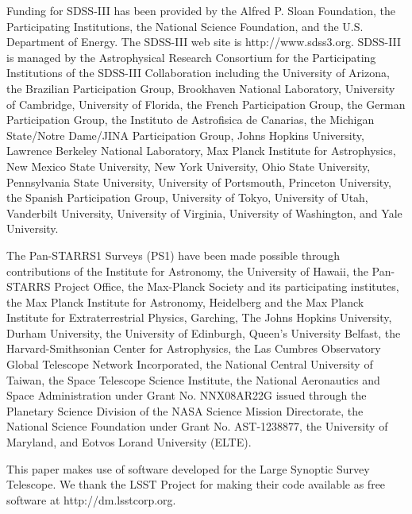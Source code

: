 \documentclass{emulateapj}
\begin{document}
\begin{CJK*}{UTF8}{gbsn}
  Funding for SDSS-III has been provided by the Alfred P. Sloan Foundation, the
  Participating Institutions, the National Science Foundation, and the U.S.  Department of
  Energy. The SDSS-III web site is http://www.sdss3.org.  SDSS-III is managed by the
  Astrophysical Research Consortium for the Participating Institutions of the SDSS-III
  Collaboration including the University of Arizona, the Brazilian Participation Group,
  Brookhaven National Laboratory, University of Cambridge, University of Florida, the
  French Participation Group, the German Participation Group, the Instituto de Astrofisica
  de Canarias, the Michigan State/Notre Dame/JINA Participation Group, Johns Hopkins
  University, Lawrence Berkeley National Laboratory, Max Planck Institute for
  Astrophysics, New Mexico State University, New York University, Ohio State University,
  Pennsylvania State University, University of Portsmouth, Princeton University, the
  Spanish Participation Group, University of Tokyo, University of Utah, Vanderbilt
  University, University of Virginia, University of Washington, and Yale University.
  
  The Pan-STARRS1 Surveys (PS1) have been made possible through contributions of the 
  Institute for Astronomy, the University of Hawaii, the Pan-STARRS Project Office, 
  the Max-Planck Society and its participating institutes, the Max Planck Institute 
  for Astronomy, Heidelberg and the Max Planck Institute for Extraterrestrial Physics, 
  Garching, The Johns Hopkins University, Durham University, the University of Edinburgh, 
  Queen's University Belfast, the Harvard-Smithsonian Center for Astrophysics, the Las 
  Cumbres Observatory Global Telescope Network Incorporated, the National Central 
  University of Taiwan, the Space Telescope Science Institute, the National Aeronautics 
  and Space Administration under Grant No. NNX08AR22G issued through the Planetary 
  Science Division of the NASA Science Mission Directorate, the National Science 
  Foundation under Grant No. AST-1238877, the University of Maryland, and Eotvos 
  Lorand University (ELTE).
  
  This paper makes use of software developed for the Large Synoptic Survey 
  Telescope. We thank the LSST Project for making their code available as free 
  software at http://dm.lsstcorp.org.
 

\end{CJK*}
\end{document}
